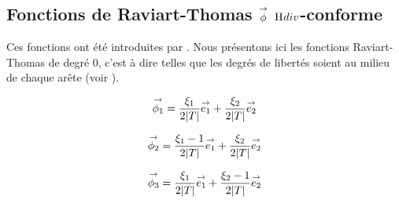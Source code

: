   \subsection[Fonctions de Raviart-Thomas phi Hdiv-conforme]{Fonctions de Raviart-Thomas \(\vect{\phi}\) \(\Hdiv\)-conforme}

    Ces fonctions ont été introduites par \cite{raviart_mixed_1977}. Nous présentons ici les fonctions Raviart-Thomas de degré 0, c'est à dire telles que les degrés de libertés soient au milieu de chaque arête (voir \cite[eq.~(3.10)]{raviart_mixed_1977}).

    \begin{minipage}{\textwidth}
      \begin{minipage}{0.329\textwidth}
          \begin{center}
            \begin{tikzpicture}[scale=1]
              
            \end{tikzpicture}
          \end{center}
          \begin{equation*}
            \vect{\phi_1}=\frac{\xi_1}{2|T|}\vect{e_1} + \frac{\xi_2}{{2|T|}}\vect{e_2}
          \end{equation*}
      \end{minipage}
      \begin{minipage}{0.329\textwidth}
          \begin{center}
            \begin{tikzpicture}[scale=1]
              
            \end{tikzpicture}
             \begin{equation*}
              \vect{\phi_2}=\frac{\xi_1-1}{2|T|}\vect{e_1} + \frac{\xi_2}{2|T|}\vect{e_2}
            \end{equation*}
          \end{center}
      \end{minipage}
      \begin{minipage}{0.329\textwidth}
          \begin{center}
            \begin{tikzpicture}[scale=1]
              
            \end{tikzpicture}
            \begin{equation*}
              \vect{\phi_3}=\frac{\xi_1}{2|T|}\vect{e_1} + \frac{\xi_2-1}{2|T|}\vect{e_2}
            \end{equation*}
          \end{center}
      \end{minipage}
      \label{fig:form_int:fon_base:phi}
    \end{minipage}

